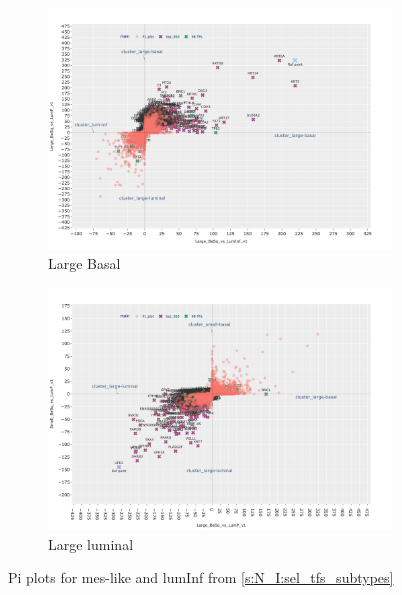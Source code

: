 \begin{figure}[H]
    \centering
    \begin{subfigure}[!t]{1.0\linewidth}
        \includegraphics[width=\textwidth,keepaspectratio]{Sections/Network_I/Resources/selective_pruning/pi_gsea/pi_largeBasal.png}
        \caption{Large Basal}
        \label{fig:ap:pi_basal}
    \end{subfigure}
    \begin{subfigure}[!t]{1.0\textwidth}
        \includegraphics[width=\textwidth,keepaspectratio]{Sections/Network_I/Resources/selective_pruning/pi_gsea/pi_largeLuminal.png}
        \caption{Large luminal}
        \label{fig:ap:pi_lum}
    \end{subfigure}
    \caption{Pi plots for mes-like and lumInf from \cref{s:N_I:sel_tfs_subtypes}}
    \label{fig:ap:pi_other_values_I}
\end{figure}

